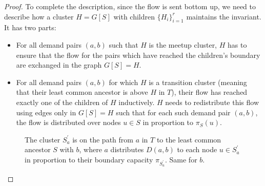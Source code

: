 \begin{proof}
	To complete the description, since the flow is sent bottom up, we need to describe how a cluster \(H= G[S]\) with children \(\{ H_i \} _{i=1}^{r}\) maintains the invariant. It has two parts:
	\begin{itemize}
		\item For all demand pairs \((a, b)\) such that \(H\) is the meetup cluster, \(H\) has to ensure that the flow for the pairs which have reached the children's boundary are exchanged in the graph \(G[S] = H\).
		\item For all demand pairs \((a, b)\) for which \(H\) is a transition cluster (meaning that their least common ancestor is above \(H\) in \(T\)), their flow has reached exactly one of the children of \(H\) inductively. \(H\) needs to redistribute this flow using edges only in \(G[S] = H\) such that for each such demand pair \((a, b)\), the flow is distributed over nodes \(u \in S\) in proportion to \(\pi _S(u)\).
	\end{itemize}
	\begin{figure}[H]
		\centering
		\caption{The cluster \(S^{\prime} _a\) is on the path from \(a\) in \(T\) to the least common ancestor \(S\) with \(b\), where \(a\) distributes \(D(a, b)\) to each node \(u \in S^{\prime} _a\) in proportion to their boundary capacity \(\pi _{S^{\prime} _a}\). Same for \(b\).}
		\label{fig:hierarchical-expander-decomposition-characterization}
	\end{figure}


\end{proof}
